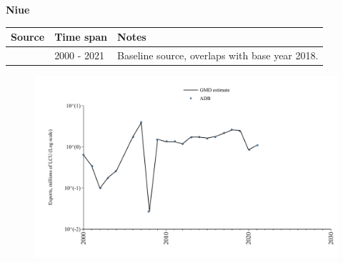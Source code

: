 \documentclass[12pt,a4paper,landscape]{article}
\begin{document}
\begin{adjustbox}{max totalsize={\paperwidth}{\paperheight},center}
\begin{minipage}[t][\textheight][t]{\textwidth}
\vspace*{0.5cm}
{}
\begin{center}
{\Large\bfseries Niue}
\end{center}
\vspace{0.5cm}
\begin{table}[H]
\centering
\small
\begin{tabular}{|l|l|l|}
\hline
\textbf{Source} & \textbf{Time span} & \textbf{Notes} \\
\hline
\rowcolor{white}\cite{ADB}& 2000 - 2021 &Baseline source, overlaps with base year 2018.\\
\hline
\end{tabular}
\end{table}
\begin{figure}[H]
\centering
\includegraphics[width=\textwidth,height=0.6\textheight,keepaspectratio]{graphs/NIU_exports.pdf}
\end{figure}
\end{minipage}
\end{adjustbox}
\end{document}
